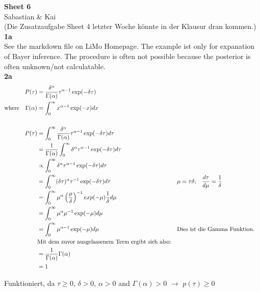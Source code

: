 \documentclass{article}
\begin{document}
\textbf{Sheet 6}\\
Sabastian \& Kai\\
(Die Zusatzaufgabe Sheet 4 letzter Woche könnte in der Klausur dran kommen.)\\

\textbf{1a}\\
See the markdown file on LiMo Homepage. The example ist only for expanation of Bayer inference. The procedure is often not possible because the posterior is often unknown/not calculatable.\\


\textbf{2a}\\
\begin{align*}
P(\tau) &= \frac{\delta^{\alpha}}{\Gamma(\alpha)} \tau^{\alpha-1} \exp(-\delta \tau)\\
\text{where} \quad \Gamma(\alpha) &= \int^\infty_{0} x^{\alpha-1} \exp(-x) dx \\
\thinspace \\
P(\tau) &= \int_0^\infty \frac{\delta^{\alpha}}{\Gamma(\alpha)} \tau^{\alpha-1} \exp(-\delta \tau) d \tau\\
&= \frac{1}{\Gamma(\alpha)} \int_0^\infty \delta^{\alpha} \tau^{\alpha-1} \exp(-\delta \tau) d \tau\\
&\propto  \int_0^\infty \delta^{\alpha} \tau^{\alpha-1} \exp(-\delta \tau) d \tau\\
&=  \int_0^\infty (\delta \tau)^{\alpha} \tau^{-1} \exp(-\delta \tau) d \tau && \mu = \tau \delta \text{;}\quad \frac{d \tau}{d \mu}=\frac{1}{\delta}\\
&= \int_0^\infty \mu^\alpha \left( \frac{\mu}{\delta} \right)^{-1} exp(-\mu) \frac{1}{\delta} d\mu\\
&= \int_0^\infty \mu^{\alpha} \mu^{-1} \exp(-\mu) d\mu\\
&= \int_0^\infty \mu^{\alpha - 1} \exp(-\mu) d\mu && \text{Dies ist die Gamma Funktion.}\\
& \text{Mit dem zuvor ausgelassenem Term ergibt sich also:}\\
&=\frac{1}{\Gamma(\alpha)}\Gamma(\alpha)\\
&= 1
\end{align*}

Funktioniert, da $\tau \ge 0$, $\delta > 0$, $\alpha > 0$ and $\Gamma(\alpha)>0$ $\rightarrow$ $p(\tau) \ge 0$\\
\newpage
\end{document}
